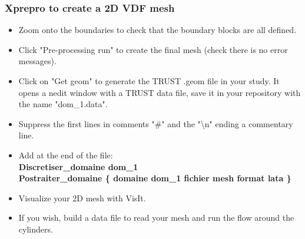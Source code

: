 \documentclass[10pt, hyperref={unicode=true,pdfusetitle, bookmarks=true,bookmarksnumbered=false,bookmarksopen=false, breaklinks=false,pdfborder={0 0 1},backref=true,colorlinks=true,linkcolor=darkblue,pageanchor}]{beamer}
\begin{document}
\begin{frame}
\frametitle{Xprepro to create a 2D VDF mesh}
\begin{block}{}

\begin{itemize}
\item Zoom onto the boundaries to check that the boundary blocks are all defined.

\item Click "Pre-processing run" to create the final mesh (check there is no error messages).

\item Click on "Get geom" to generate the TRUST .geom file in your study. It opens a nedit window with a TRUST data file, save it in your repository with the name "dom\_1.data".
\item Suppress the first lines in comments "\#" and the "\textbackslash{}n" ending a commentary line.
\item Add at the end of the file:\\
\textbf{Discretiser\_domaine dom\_1} \\
\textbf{Postraiter\_domaine \{ domaine dom\_1 fichier mesh format lata \} }
\item Visualize your 2D mesh with VisIt.
\item If you wish, build a data file to read your mesh and run the flow around the cylinders.
\end{itemize}

\end{block}
\end{frame}
\end{document}
